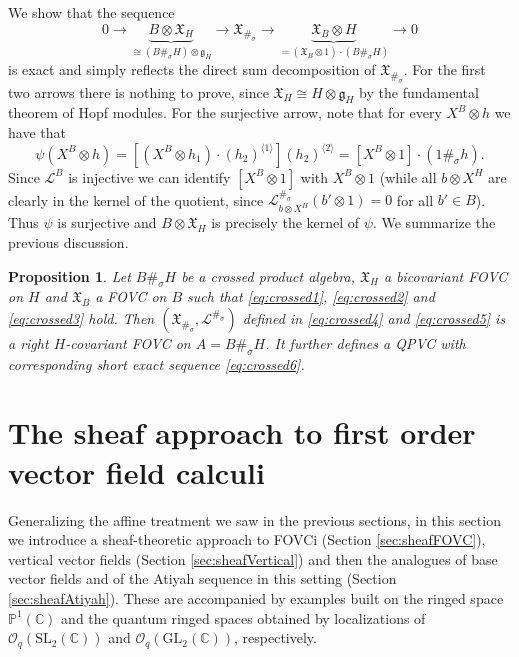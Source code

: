 \documentclass{article}
\newtheorem{proposition}[thm]{Proposition}
\theoremstyle{definition}
\begin{document}
We show that the sequence
\begin{equation}\label{eq:crossed6}
	0\to\underbrace{B\otimes\mathfrak{X}_H}_{\cong(B\#_\sigma H)\otimes\mathfrak{g}_H}\to\mathfrak{X}_{\#_\sigma}\to\underbrace{\mathfrak{X}_B\otimes H}_{=(\mathfrak{X}_B\otimes 1)\cdot(B\#_\sigma H)}\to 0
\end{equation}
is exact and simply reflects the direct sum decomposition of $\mathfrak{X}_{\#_\sigma}$. For the first two arrows there is nothing to prove, since $\mathfrak{X}_H\cong H\otimes\mathfrak{g}_H$ by the fundamental theorem of Hopf modules. For the surjective arrow, note that for every $X^B\otimes h$ we have that 
$$
\psi(X^B\otimes h)
=[(X^B\otimes h_1)\cdot (h_2)^{\langle 1\rangle}](h_2)^{\langle 2\rangle}
=[X^B\otimes 1]\cdot(1\#_\sigma h).
$$
Since $\mathscr{L}^B$ is injective we can identify $[X^B\otimes 1]$ with $X^B\otimes 1$ (while all $b\otimes X^H$ are clearly in the kernel of the quotient, since $\mathscr{L}^{\#_\sigma}_{b\otimes X^H}(b'\otimes 1)=0$ for all $b'\in B$). Thus $\psi$ is surjective and $B\otimes\mathfrak{X}_H$ is precisely the kernel of $\psi$. We summarize the previous discussion.
\begin{proposition}
	Let $B\#_\sigma H$ be a crossed product algebra, $\mathfrak{X}_H$ a bicovariant FOVC on $H$ and $\mathfrak{X}_B$ a FOVC on $B$ such that \eqref{eq:crossed1}, \eqref{eq:crossed2} and \eqref{eq:crossed3} hold. Then $(\mathfrak{X}_{\#_\sigma},\mathscr{L}^{\#_\sigma})$ defined in \eqref{eq:crossed4} and \eqref{eq:crossed5} is a right $H$-covariant FOVC on $A=B\#_\sigma H$. It further defines a QPVC with corresponding short exact sequence \eqref{eq:crossed6}.
\end{proposition}


\section{The sheaf approach to first order vector field calculi}\label{sec:sheaf}

Generalizing the affine treatment we saw in the previous sections,
in this section we introduce a sheaf-theoretic approach to FOVCi (Section \ref{sec:sheafFOVC}), vertical vector fields (Section \ref{sec:sheafVertical}) and then the analogues of base vector fields and of
the Atiyah sequence in this setting (Section \ref{sec:sheafAtiyah}). These are accompanied by examples built on the ringed space $\mathbb{P}^1(\mathbb{C})$ and the quantum ringed spaces obtained by localizations of $\mathcal{O}_q(\mathrm{SL}_2(\mathbb{C}))$ and $\mathcal{O}_q(\mathrm{GL}_2(\mathbb{C}))$, respectively. 
\end{document}
